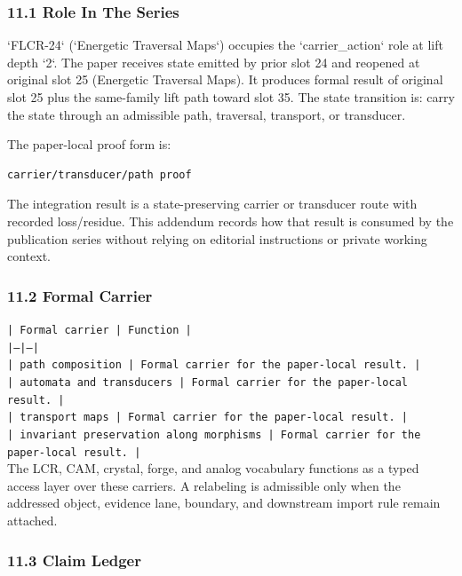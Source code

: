 \documentclass[11pt]{article}
\begin{document}
\subsubsection*{11.1 Role In The Series}

`FLCR-24` (`Energetic Traversal Maps`) occupies the `carrier\_action` role at lift depth `2`.
The paper receives state emitted by prior slot 24 and reopened at original slot 25 (Energetic Traversal Maps). It produces formal result of original slot 25 plus the same-family lift path toward slot 35. The state transition is:
carry the state through an admissible path, traversal, transport, or transducer.

The paper-local proof form is:

\begin{verbatim}
carrier/transducer/path proof
\end{verbatim}

The integration result is a state-preserving carrier or transducer route with recorded loss/residue. This addendum records how that result is
consumed by the publication series without relying on editorial instructions or
private working context.

\subsubsection*{11.2 Formal Carrier}

\noindent\texttt{| Formal carrier | Function |}\\
\noindent\texttt{|---|---|}\\
\noindent\texttt{| path composition | Formal carrier for the paper-local result. |}\\
\noindent\texttt{| automata and transducers | Formal carrier for the paper-local result. |}\\
\noindent\texttt{| transport maps | Formal carrier for the paper-local result. |}\\
\noindent\texttt{| invariant preservation along morphisms | Formal carrier for the paper-local result. |}\\

The LCR, CAM, crystal, forge, and analog vocabulary functions as a typed access
layer over these carriers. A relabeling is admissible only when the addressed
object, evidence lane, boundary, and downstream import rule remain attached.

\subsubsection*{11.3 Claim Ledger}
\end{document}
